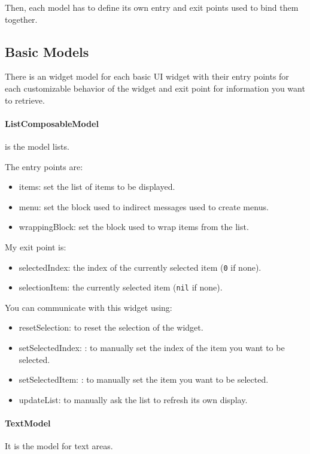 \documentclass[a4paper,10pt,twoside]{book}
\begin{document}
Then, each model has to define its own entry and exit points used to bind them together.

\subsection{Basic Models}

There is an widget model for each basic UI widget  with their entry points for each customizable behavior of the widget and exit point for information you want to retrieve.  

\paragraph{ListComposableModel} is the model lists.

The entry points are:
\begin{itemize}
	\item items: set the list of items to be displayed.
	\item menu: set the block used to indirect messages used to create menus.
	\item wrappingBlock: set the block used to wrap items from the list.
\end{itemize}
My exit point is:
\begin{itemize}
	\item selectedIndex: the index of the currently selected item (\verb+0+ if none).
	\item selectionItem: the currently selected item (\verb+nil+ if none).
\end{itemize}
You can communicate with this widget using:
\begin{itemize}
\item resetSelection: to reset the selection of the widget.
\item setSelectedIndex: : to manually set the index of the item you want to be selected.
\item setSelectedItem: : to manually set the item you want to be selected. 
\item updateList: to manually ask the list to refresh its own display.
\end{itemize}


\paragraph{TextModel} It is the model for text areas.
\end{document}
